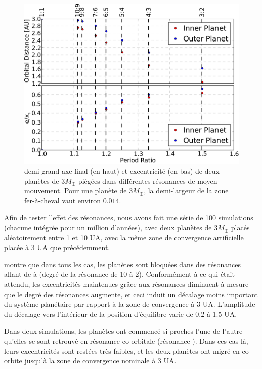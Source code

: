 \begin{figure}[htbp]
\centering
\includegraphics[width=0.95\linewidth]{figure/shifted/influence_of_MMR.pdf}
\caption{demi-grand axe final (en haut) et excentricité (en bas) de deux planètes de $3\unit{M_\oplus}$ piégées dans différentes résonances de moyen mouvement. Pour une planète de $3\unit{M_\oplus}$, la demi-largeur de la zone fer-à-cheval vaut environ $0.014$.}\label{fig:influence_of_MMR}
\end{figure}

Afin de tester l'effet des résonances, nous avons fait une série de 100 simulations (chacune intégrée pour un million d'années), avec deux planètes de $3\unit{M_\oplus}$ placés aléatoirement entre 1 et 10 UA, avec la même zone de convergence artificielle placée à 3 UA que précédemment. 

 montre que dans tous les cas, les planètes sont bloquées dans des résonances allant de  à  (degré de la résonance de 10 à 2). Conformément à ce qui était attendu, les excentricités maintenues grâce aux résonances diminuent à mesure que le degré des résonances augmente, et ceci induit un décalage moins important du système planétaire par rapport à la zone de convergence à 3 UA. L'amplitude du décalage vers l'intérieur de la position d'équilibre varie de 0.2 à 1.5 UA. 

Dans deux simulations, les planètes ont commencé si proches l'une de l'autre qu'elles se sont retrouvé en résonance co-orbitale (résonance ). Dans ces cas là, leurs excentricités sont restées très faibles, et les deux planètes ont migré en co-orbite jusqu'à la zone de convergence nominale à 3 UA. 

